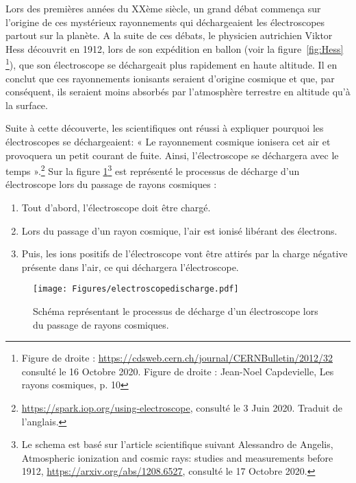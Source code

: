\documentclass[a4paper, 12pt]{article}
\begin{document}
\begin{spacing}{1.5}
Lors des premières années du XXème siècle, un grand débat commença sur l’origine de ces mystérieux rayonnements qui déchargeaient les électroscopes partout sur la planète. A la suite de ces débats, le physicien autrichien Viktor Hess découvrit en 1912, lors de son expédition en ballon (voir la figure~\ref{fig:Hess} \footnote{Figure de droite : \url{https://cdsweb.cern.ch/journal/CERNBulletin/2012/32} consulté le 16 Octobre 2020. Figure de droite : Jean-Noel Capdevielle, Les rayons cosmiques, p. 10}), que son électroscope se déchargeait plus rapidement en haute altitude. Il en conclut que ces rayonnements ionisants seraient d’origine cosmique et que, par conséquent, ils seraient moins absorbés par l’atmosphère terrestre en altitude qu’à la surface.


Suite à cette découverte, les scientifiques ont réussi à expliquer pourquoi les électroscopes se déchargeaient: « Le rayonnement cosmique ionisera cet air et provoquera un petit courant de fuite. Ainsi, l'électroscope se déchargera avec le temps ».\footnote{\url{https://spark.iop.org/using-electroscope}, consulté le 3 Juin 2020. Traduit de l'anglais.} Sur la figure \ref{fig:electroscopedischarge}\footnote{Le schema est basé sur l'article scientifique suivant Alessandro de Angelis, Atmospheric ionization and cosmic rays: studies and measurements before 1912, \url{https://arxiv.org/abs/1208.6527}, consulté le 17 Octobre 2020.} est représenté le processus de décharge d'un électroscope lors du passage de rayons cosmiques :
\begin{enumerate}
  \item Tout d'abord, l'électroscope doit être chargé.
  \item Lors du passage d'un rayon cosmique, l'air est ionisé libérant des électrons.
  \item Puis, les ions positifs de l'électroscope vont être attirés par la charge négative présente dans l'air, ce qui déchargera l'électroscope.
\end{enumerate}

\begin{figure}[t]
\begin{center}
\texttt{[image: Figures/electroscopedischarge.pdf]}
\caption{\label{fig:electroscopedischarge} Schéma représentant le processus de décharge d'un électroscope lors du passage de rayons cosmiques.}
\end{center}
\end{figure}




\end{spacing}
\end{document}
